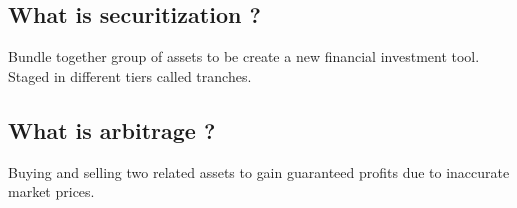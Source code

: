 \documentclass[11pt]{scrartcl} %
\begin{document}
\subsection{What is securitization ?}

Bundle together group of assets to be create a new financial investment tool. Staged in different tiers called tranches.

\subsection{What is arbitrage ?}

Buying and selling two related assets to gain guaranteed profits due to inaccurate market prices.






\end{document}
